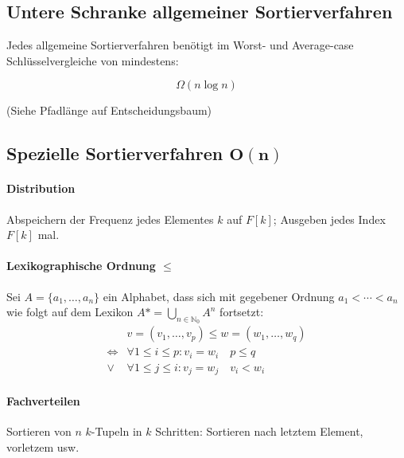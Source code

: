 \subsection{Untere Schranke allgemeiner Sortierverfahren}

\begin{mzImportant}
  Jedes allgemeine Sortierverfahren benötigt im Worst- und Average-case Schlüsselvergleiche von mindestens:

  $$\Omega (n \log n)$$
\end{mzImportant}

(Siehe Pfadlänge auf Entscheidungsbaum)

\subsection{Spezielle Sortierverfahren $\mathbf{O(n)}$}

\paragraph{Distribution}

Abspeichern der Frequenz jedes Elementes $k$ auf $F[k]$; Ausgeben jedes Index $F[k]$ mal.

\begin{mzImportant}
  \paragraph{Lexikographische Ordnung $\mathbf{\leq}$}
  Sei $A = \{ a_1, \dots, a_n \}$ ein Alphabet, dass sich mit gegebener Ordnung $a_1 < \cdots < a_n$ wie folgt auf dem Lexikon $A* = \bigcup_{n \in \mathbb{N}_0} A^n$ fortsetzt:
  \begin{align*}
                    & v = (v_1, \dots, v_p) \leq w = (w_1, \dots, w_q)   \\
    \Leftrightarrow & \forall 1 \leq i \leq p: v_i = w_i \quad p \leq q  \\
    \lor            & \forall 1 \leq j \leq i: v_j = w_j \quad v_i < w_i
  \end{align*}

  \paragraph{Fachverteilen}
  Sortieren von $n$ $k$-Tupeln in $k$ Schritten: Sortieren nach letztem Element, vorletzem usw.
\end{mzImportant}

